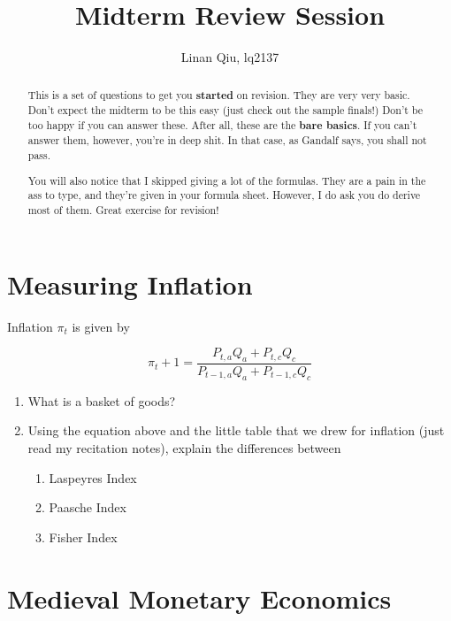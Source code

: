 \documentclass[11pt]{scrartcl}
\title{Midterm Review Session}
\author{Linan Qiu, lq2137}
\begin{document}
\maketitle

\begin{abstract}
This is a set of questions to get you \textbf{started} on revision. They are very very basic. Don't expect the midterm to be this easy (just check out the sample finals!) Don't be too happy if you can answer these. After all, these are the \textbf{bare basics}. If you can't answer them, however, you're in deep shit. In that case, as Gandalf says, you shall not pass.

You will also notice that I skipped giving a lot of the formulas. They are a pain in the ass to type, and they're given in your formula sheet. However, I do ask you do derive most of them. Great exercise for revision!
\end{abstract}

\section{Measuring Inflation}

Inflation $\pi_t$ is given by

\[ \pi_t + 1 = \frac{P_{t,a} Q_a + P_{t,c}Q_c}{P_{t-1, a}Q_a + P_{t-1,c}Q_c} \] 

\begin{enumerate}
\item What is a basket of goods?
\item Using the equation above and the little table that we drew for inflation (just read my recitation notes), explain the differences between
\begin{enumerate}
\item Laspeyres Index
\item Paasche Index
\item Fisher Index
\end{enumerate}
\end{enumerate}

\section{Medieval Monetary Economics}
\end{document}
